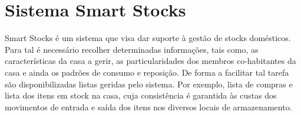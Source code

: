 







%
%
\section{Sistema Smart Stocks} \label{sec22}
Smart Stocks é um sistema que visa dar suporte à gestão de stocks domésticos. Para tal é necessário recolher determinadas informações, tais como, as características da casa a gerir, as particularidades dos membros co-habitantes da casa e ainda os padrões de consumo e reposição. De forma a facilitar tal tarefa são disponibilizadas listas geridas pelo sistema. Por exemplo, lista de compras e lista dos itens em stock na casa, cuja consistência é garantida às custas dos movimentos de entrada e saída dos itens nos diversos locais de armazenamento.


